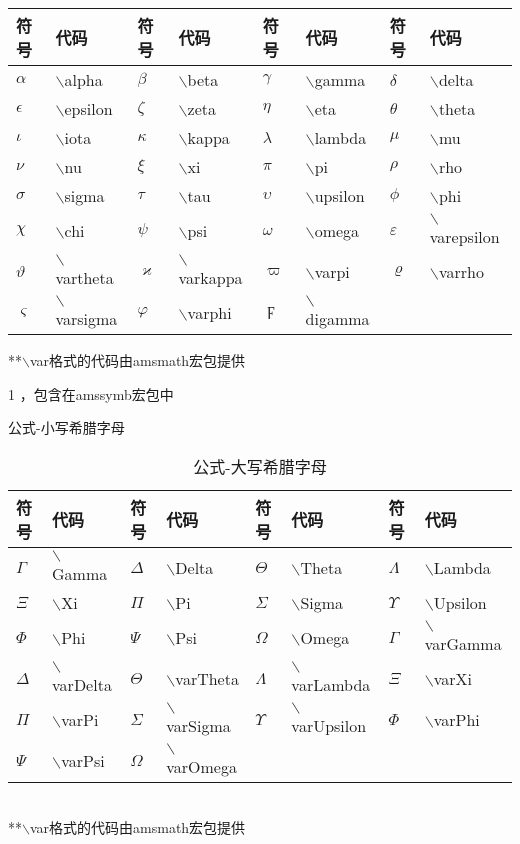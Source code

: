 \documentclass[UTF8,fontset=ubuntu]{ctexart}
\begin{document}
\begin{threeparttable}
\begin{tabular}{l l l l l l l l}
	\hline
	符号 & 代码 & 符号 & 代码 & 符号 & 代码 & 符号 & 代码\\
	\hline
	$\alpha$ & $\backslash$alpha & $\beta$ & $\backslash$beta & $\gamma$ & $\backslash$gamma & $\delta$ & $\backslash$delta\\
	$\epsilon$ & $\backslash$epsilon & $\zeta$ & $\backslash$zeta & $\eta$ & $\backslash$eta & $\theta$ & $\backslash$theta\\
	$\iota$ & $\backslash$iota & $\kappa$ & $\backslash$kappa & $\lambda$ & $\backslash$lambda & $\mu$ & $\backslash$mu\\
	$\nu$ & $\backslash$nu & $\xi$ & $\backslash$xi & $\pi$ & $\backslash$pi & $\rho$ & $\backslash$rho\\
	$\sigma$ & $\backslash$sigma & $\tau$ & $\backslash$tau & $\upsilon$ & $\backslash$upsilon & $\phi$ & $\backslash$phi\\
	$\chi$ & $\backslash$chi & $\psi$ & $\backslash$psi & $\omega$ & $\backslash$omega & $\varepsilon$ & $\backslash$varepsilon\\
	$\vartheta$ & $\backslash$vartheta & $\varkappa$ & $\backslash$varkappa\tnote{1} & $\varpi$ & $\backslash$varpi & $\varrho$ & $\backslash$varrho\tnote{1}\\
	$\varsigma$ & $\backslash$varsigma & $\varphi$ & $\backslash$varphi & $\digamma$ & $\backslash$digamma\tnote{1}\\
	\hline
\end{tabular}
**$\backslash$var格式的代码由amsmath宏包提供
\begin{tablenotes}
	\item[1] ，包含在amssymb宏包中
\end{tablenotes}
\caption{公式-小写希腊字母}
\end{threeparttable}
\begin{table}[H]
\begin{tabular}{l l l l l l l l}
	\hline
	符号 & 代码 & 符号 & 代码 & 符号 & 代码 & 符号 & 代码\\
	\hline
	$\Gamma$ & $\backslash$Gamma & $\Delta$ & $\backslash$Delta & $\Theta$ & $\backslash$Theta & $\Lambda$ & $\backslash$Lambda\\
	$\Xi$ & $\backslash$Xi & $\Pi$ & $\backslash$Pi & $\Sigma$ & $\backslash$Sigma & $\Upsilon$ & $\backslash$Upsilon\\
	$\Phi$ & $\backslash$Phi & $\Psi$ & $\backslash$Psi & $\Omega$ & $\backslash$Omega & $\varGamma$ & $\backslash$varGamma\\
	$\varDelta$ & $\backslash$varDelta & $\varTheta$ & $\backslash$varTheta & $\varLambda$ & $\backslash$varLambda & $\varXi$ & $\backslash$varXi\\
	$\varPi$ & $\backslash$varPi & $\varSigma$ & $\backslash$varSigma & $\varUpsilon$ & $\backslash$varUpsilon & $\varPhi$ & $\backslash$varPhi\\
	$\varPsi$ & $\backslash$varPsi & $\varOmega$ & $\backslash$varOmega\\
	\hline
\end{tabular}\\[2mm]
**$\backslash$var格式的代码由amsmath宏包提供
\caption{公式-大写希腊字母}
\end{table}
\end{document}
